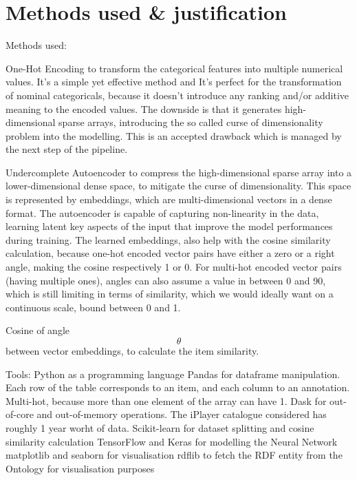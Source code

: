 
\section{Methods used \& justification}

Methods used:

One-Hot Encoding to transform the categorical features into multiple numerical values.
It's a simple yet effective method and It's perfect for the transformation of nominal categoricals,
because it doesn't introduce any ranking and/or additive meaning to the
encoded values. The downside is that it generates high-dimensional sparse arrays, introducing the
so called curse of dimensionality problem into the modelling. This is an accepted drawback which is managed
by the next step of the pipeline.

Undercomplete Autoencoder to compress the high-dimensional sparse array into a lower-dimensional dense space,
to mitigate the curse of dimensionality. This space is represented by embeddings, which are multi-dimensional vectors in a dense format.
The autoencoder is capable of capturing non-linearity in the data, learning latent key aspects of the input that improve the model performances
during training.
The learned embeddings, also help with the cosine similarity calculation, because one-hot encoded vector pairs have
either a zero or a right angle, making the cosine respectively 1 or 0. For multi-hot encoded vector pairs (having multiple ones),
angles can also assume a value in between 0 and 90, which is still limiting in terms of similarity, which we would ideally want on
a continuous scale, bound between 0 and 1.



Cosine of angle $$\theta$$ between vector embeddings, to calculate the item similarity.


Tools:
Python as a programming language
Pandas for dataframe manipulation. Each row of the table corresponds to an item, and each column to an annotation. Multi-hot, because more than one element of the array can have 1.
Dask for out-of-core and out-of-memory operations. The iPlayer catalogue considered has roughly 1 year worht of data.
Scikit-learn for dataset splitting and cosine similarity calculation
TensorFlow and Keras for modelling the Neural Network
matplotlib and seaborn for visualisation
rdflib to fetch the RDF entity from the Ontology for visualisation purposes


